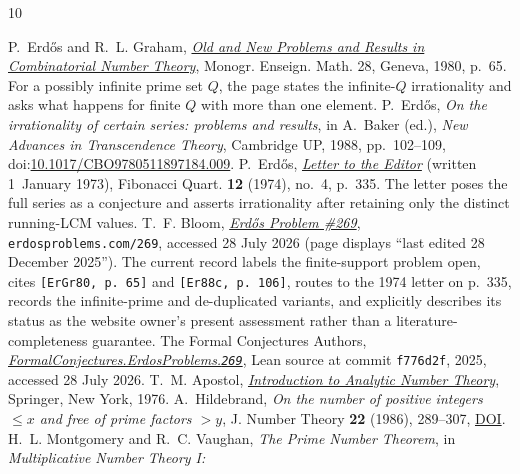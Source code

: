 \documentclass[11pt]{article}
\begin{document}
\begin{thebibliography}{10}
\small
\raggedright
\setlength{\itemsep}{0pt}
 P.~Erd\H{o}s and R.~L. Graham,
  \href{https://mathweb.ucsd.edu/~ronspubs/80_11_number_theory.pdf}{\emph{Old
  and New Problems and Results in Combinatorial Number Theory}},
  Monogr. Enseign. Math. 28, Geneva, 1980, p.~65.  For a possibly infinite
  prime set $Q$, the page states the infinite-$Q$ irrationality and asks what
  happens for finite $Q$ with more than one element.
 P.~Erd\H{o}s, \emph{On the irrationality of certain series:
  problems and results}, in A.~Baker (ed.), \emph{New Advances in Transcendence
  Theory}, Cambridge UP, 1988, pp.~102--109,
  doi:\href{https://doi.org/10.1017/CBO9780511897184.009}{10.1017/CBO9780511897184.009}.
 P.~Erd\H{o}s,
  \href{https://www.fq.math.ca/Scanned/12-4/letter.pdf}{\emph{Letter to the
  Editor}} (written 1~January 1973), Fibonacci Quart. \textbf{12} (1974),
  no.~4, p.~335.  The letter poses the full series as a conjecture and asserts
  irrationality after retaining only the distinct running-LCM values.
 T.~F. Bloom,
  \href{https://www.erdosproblems.com/269}{\emph{Erd\H{o}s Problem \#269}},
  \texttt{erdosproblems.com/269}, accessed 28 July 2026 (page displays
  ``last edited 28 December 2025'').  The current record labels the
  finite-support problem open, cites \texttt{[ErGr80, p.~65]} and
  \texttt{[Er88c, p.~106]}, routes to the 1974 letter on p.~335, records the
  infinite-prime and de-duplicated variants, and explicitly describes its
  status as the website owner's present assessment rather than a
  literature-completeness guarantee.
 The Formal Conjectures Authors,
  \href{https://github.com/google-deepmind/formal-conjectures/blob/f776d2f2039351b00737ffcafb9d7d7666e1d9af/FormalConjectures/ErdosProblems/269.lean}
  {\emph{FormalConjectures.ErdosProblems.\texttt{269}}},
  Lean source at commit \texttt{f776d2f}, 2025, accessed 28 July 2026.
 T.~M. Apostol,
  \href{https://doi.org/10.1007/978-1-4757-5579-4}
  {\emph{Introduction to Analytic Number Theory}},
  Springer, New York, 1976.
 A.~Hildebrand,
  \emph{On the number of positive integers $\le x$ and free of prime factors
  $>y$}, J. Number Theory \textbf{22} (1986), 289--307,
  \href{https://doi.org/10.1016/0022-314X(86)90013-2}{DOI}.
 H.~L. Montgomery and R.~C. Vaughan,
  \emph{The Prime Number Theorem}, in \emph{Multiplicative Number Theory I:
}
\end{thebibliography}
\end{document}
